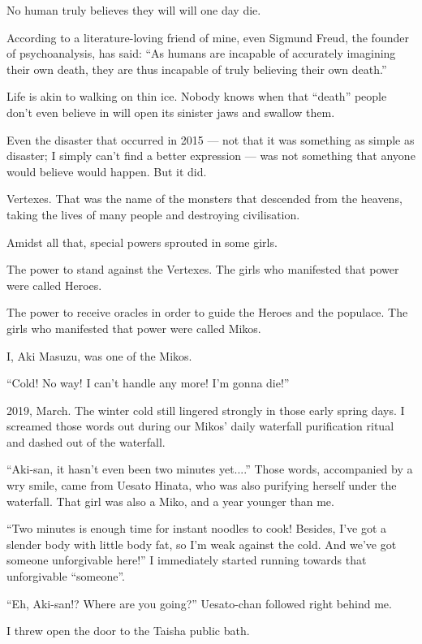 

No human truly believes they will will one day die.

According to a literature-loving friend of mine, even Sigmund Freud, the founder of psychoanalysis, has said: ``As humans are incapable of accurately imagining their own death, they are thus incapable of truly believing their own death.''

Life is akin to walking on thin ice. Nobody knows when that ``death'' people don't even believe in will open its sinister jaws and swallow them.

Even the disaster that occurred in 2015 --- not that it was something as simple as disaster; I simply can't find a better expression --- was not something that anyone would believe would happen. But it did.

Vertexes. That was the name of the monsters that descended from the heavens, taking the lives of many people and destroying civilisation.

Amidst all that, special powers sprouted in some girls.

The power to stand against the Vertexes. The girls who manifested that power were called Heroes.

The power to receive oracles in order to guide the Heroes and the populace. The girls who manifested that power were called Mikos.

I, Aki Masuzu, was one of the Mikos.

``Cold! No way! I can't handle any more! I'm gonna die!''

2019, March. The winter cold still lingered strongly in those early spring days. I screamed those words out during our Mikos' daily waterfall purification ritual and dashed out of the waterfall.

``Aki-san, it hasn't even been two minutes yet....''  Those words, accompanied by a wry smile, came from Uesato Hinata, who was also purifying herself under the waterfall. That girl was also a Miko, and a year younger than me.

``Two minutes is enough time for instant noodles to cook! Besides, I've got a slender body with little body fat, so I'm weak against the cold. And we've got someone unforgivable here!''  I immediately started running towards that unforgivable ``someone''.

``Eh, Aki-san!? Where are you going?''  Uesato-chan followed right behind me.

I threw open the door to the Taisha public bath.

